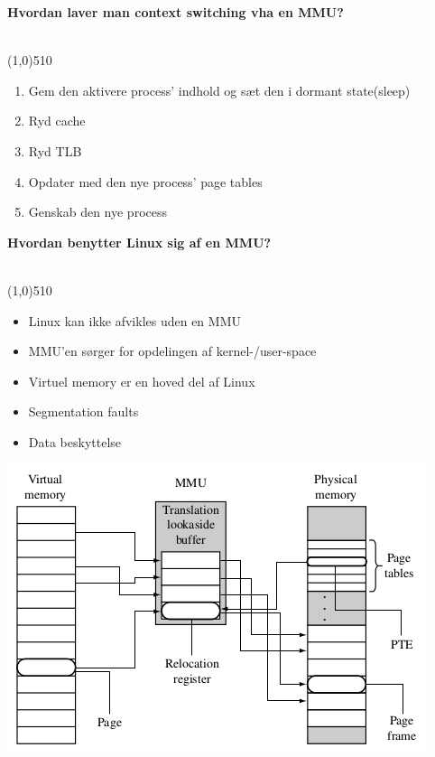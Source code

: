 \documentclass{paper}
\begin{document}
\begin{large}\textbf{Hvordan laver man context switching vha en MMU?}\end{large}\\
\line(1,0){510}
\begin{enumerate}
	\item Gem den aktivere process' indhold og s\ae t den i dormant state(sleep)
	\item Ryd cache
	\item Ryd TLB
	\item Opdater med den nye process' page tables
	\item Genskab den nye process\\
\end{enumerate}

\begin{large}\textbf{Hvordan benytter Linux sig af en MMU?}\end{large}\\
\line(1,0){510}
\begin{itemize}
	\item Linux kan ikke afvikles uden en MMU
	\item MMU'en s\o rger for opdelingen af kernel-/user-space
	\item Virtuel memory er en hoved del af Linux 
	\item Segmentation faults
	\item Data beskyttelse
\end{itemize}
\includegraphics[scale=0.7]{mmu.png}
\end{document}
